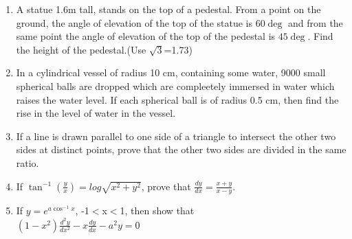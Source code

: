 \begin{enumerate}
\begin{figure}[H]
                 \caption{}
                 \label{}
          \end{figure}
\item A statue 1.6m tall, stands on the top of a pedestal. From a point on the ground, the angle of elevation of the top of the statue is $60\deg$ and from the same point the angle of elevation of the top of the pedestal is $45\deg$. Find the height of the pedestal.(Use $\sqrt{
    3}$=1.73)
\item In a cylindrical vessel of radius 10 cm, containing some water, 9000 small spherical balls are dropped which are compleetely immersed in water which raises the water level. If each spherical ball is of radius 0.5 cm, then find the rise in the level of water in the vessel.
\item If a line is drawn parallel to one side of a triangle to intersect the other two sides at distinct points, prove that the other two sides are divided in the same ratio.
\item If $\tan^{-1}\left(\frac{y}{x}\right)=log\sqrt{x^2+y^2}$, prove that $\frac{dy}{dx}=\frac{x+y}{x-y}$.
\item If $y=e^{a \cos^{-1}x}$, -1$<$x$<$1, then show that\\
         $(1-x^2)\frac{d^2y}{dx^2}-x\frac{dy}{dx}-a^2y=0$		
\end{enumerate}
